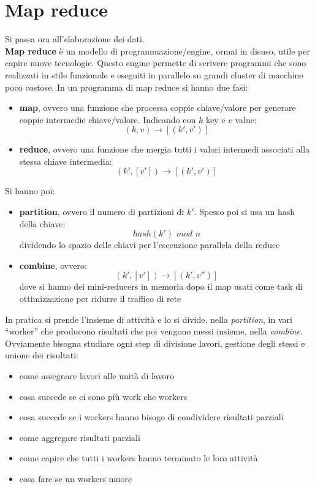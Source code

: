 \documentclass[a4paper,12pt, oneside]{book}
\begin{document}
\section{Map reduce}
Si passa ora all'elaborazione dei dati.\\
\textbf{Map reduce} è un modello di programmazione/engine, ormai in disuso,
utile per capire nuove tecnologie. Questo engine permette di scrivere programmi
che sono realizzati in stile funzionale e eseguiti in parallelo su grandi
cluster di macchine poco costose. In un programma di map reduce si hanno due
fasi:
\begin{itemize}
  \item \textbf{map}, ovvero una funzione che processa coppie chiave/valore per
  generare coppie intermedie chiave/valore. Indicando con $k$ key e $v$ value:
  \[(k,v)\to[(k',v')]\]
  \item \textbf{reduce}, ovvero una funzione che mergia tutti i valori
  intermedi associati alla stessa chiave intermedia:
  \[(k',[v'])\to[(k',v')]\]
\end{itemize}
Si hanno poi:
\begin{itemize}
  \item \textbf{partition}, ovvero il numero di partizioni di $k'$. Spesso poi
  si usa un hash della chiave:
  \[hash(k')\,\,mod\,\,n\]
  dividendo lo spazio delle chiavi per l'esecuzione parallela della reduce
  \item \textbf{combine}, ovvero:
  \[(k',[v'])\to[(k',v'')]\]
  dove si hanno dei mini-reducers in memoria dopo il map usati come task di
  ottimizzazione per ridurre il traffico di rete
\end{itemize}
In pratica si prende l'insieme di attività e lo si divide, nella
\textit{partition}, in vari ``worker'' che 
producono risultati che poi vengono messi insieme, nella
\textit{combine}. Ovviamente bisogna studiare ogni step di divisione lavori,
gestione degli stessi e unione dei risultati:
\begin{itemize}
  \item come assegnare lavori alle unità di lavoro
  \item cosa succede se ci sono più work che workers
  \item cosa succede se i workers hanno bisogo di condividere risultati
  parziali
  \item come aggregare risultati parziali
  \item come capire che tutti i workers hanno terminato le loro attività
  \item cosa fare se un workers muore
\end{itemize}
\end{document}
